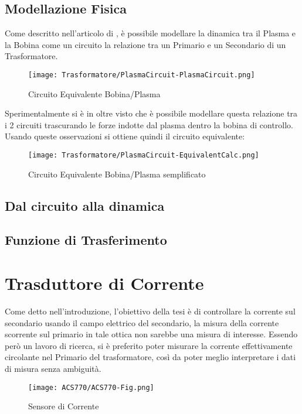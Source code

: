 \subsection{Modellazione Fisica}

Come descritto nell'articolo di \cite{TokamakCircuit}, è possibile modellare la dinamica tra il Plasma e la Bobina come un circuito la relazione tra un Primario e un Secondario di un Trasformatore.
\begin{figure}[h]
	\centering
	\texttt{[image: Trasformatore/PlasmaCircuit-PlasmaCircuit.png]}
	\caption[Circuito Equivalente Bobina/Plasma all'interno di un Tokamak]{Circuito Equivalente Bobina/Plasma}
\end{figure}

\noindent
Sperimentalmente si è in oltre visto che è possibile modellare questa relazione tra i 2 circuiti trascurando le forze indotte dal plasma dentro la bobina di controllo. Usando queste osservazioni si ottiene quindi il circuito equivalente:
\begin{figure}[h]
	\centering
	\texttt{[image: Trasformatore/PlasmaCircuit-EquivalentCalc.png]}
	\caption[Circuito Equivalente Bobina/Plasma all'interno di un Tokamak trascurando l'induzione del plasma verso la bobina]{Circuito Equivalente Bobina/Plasma semplificato}
\end{figure}


\subsection{Dal circuito alla dinamica}

\subsection{Funzione di Trasferimento}

\newpage


\section{Trasduttore di Corrente}\label{CurrentSense}
Come detto nell'introduzione, l'obiettivo della tesi è di controllare la corrente sul secondario usando il campo elettrico del secondario, la misura della corrente scorrente sul primario in tale ottica non sarebbe una misura di interesse. Essendo però un lavoro di ricerca, si è preferito poter misurare la corrente effettivamente circolante nel Primario del trasformatore, così da poter meglio interpretare i dati di misura senza ambiguità.\\
\begin{figure}[h]
	\centering
	\texttt{[image: ACS770/ACS770-Fig.png]}
	\caption[Sensore di Corrente ]{Sensore di Corrente}
\end{figure}

